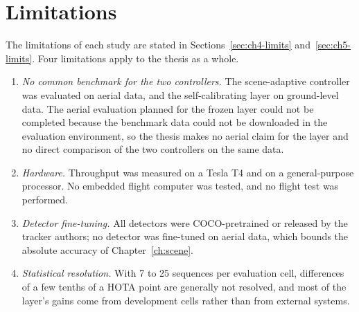 \section{Limitations}\label{sec:c-limits}
The limitations of each study are stated in Sections~\ref{sec:ch4-limits} and~\ref{sec:ch5-limits}. Four limitations apply to the thesis as a whole.
\begin{enumerate}
\item \emph{No common benchmark for the two controllers.} The scene-adaptive controller was evaluated on aerial data, and the self-calibrating layer on ground-level data. The aerial evaluation planned for the frozen layer could not be completed because the benchmark data could not be downloaded in the evaluation environment, so the thesis makes no aerial claim for the layer and no direct comparison of the two controllers on the same data.
\item \emph{Hardware.} Throughput was measured on a Tesla T4 and on a general-purpose processor. No embedded flight computer was tested, and no flight test was performed.
\item \emph{Detector fine-tuning.} All detectors were COCO-pretrained or released by the tracker authors; no detector was fine-tuned on aerial data, which bounds the absolute accuracy of Chapter~\ref{ch:scene}.
\item \emph{Statistical resolution.} With 7 to 25 sequences per evaluation cell, differences of a few tenths of a HOTA point are generally not resolved, and most of the layer's gains come from development cells rather than from external systems.
\end{enumerate}


